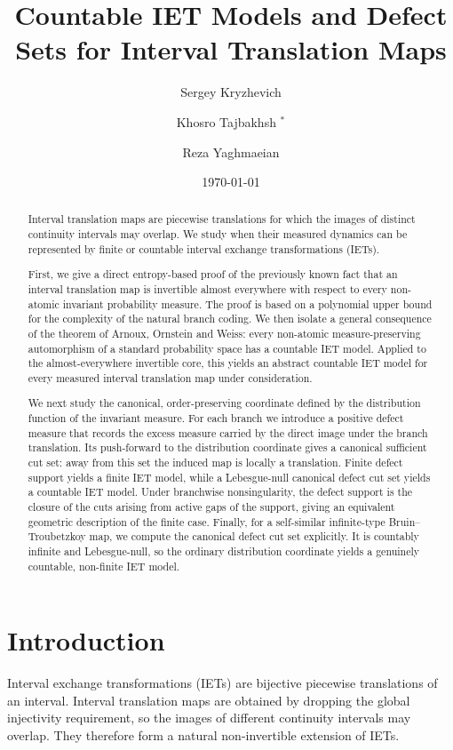 \documentclass[11pt]{amsart}
\title[Countable IET models for interval translation maps]
{Countable IET Models and Defect Sets for Interval Translation Maps}
\author[S. Kryzhevich]{Sergey Kryzhevich}
\author[K. Tajbakhsh]{Khosro Tajbakhsh $^{*}$}
\author[R. Yaghmaeian]{Reza Yaghmaeian}
\date{\today}
\theoremstyle{plain}
\theoremstyle{definition}
\theoremstyle{remark}
\begin{document}
\begin{abstract}
Interval translation maps are piecewise translations for which the images of distinct
continuity intervals may overlap. We study when their measured dynamics can be represented
by finite or countable interval exchange transformations (IETs).

First, we give a direct entropy-based proof of the previously known fact that an interval
translation map is invertible almost everywhere with respect to every non-atomic invariant
probability measure. The proof is based on a polynomial upper bound for the complexity of the
natural branch coding. We then isolate a general consequence of the theorem of Arnoux,
Ornstein and Weiss: every non-atomic measure-preserving automorphism of a standard
probability space has a countable IET model. Applied to the almost-everywhere invertible
core, this yields an abstract countable IET model for every measured interval translation
map under consideration.

We next study the canonical, order-preserving coordinate defined by the distribution function
of the invariant measure. For each branch we introduce a positive defect measure that records
the excess measure carried by the direct image under the branch translation. Its push-forward
to the distribution coordinate gives a canonical sufficient cut set: away from this set the
induced map is locally a translation. Finite defect support yields a finite IET model, while a
Lebesgue-null canonical defect cut set yields a countable IET model. Under branchwise nonsingularity, the
defect support is the closure of the cuts arising from active gaps of the support, giving an
equivalent geometric description of the finite case. Finally, for a self-similar infinite-type
Bruin--Troubetzkoy map, we compute the canonical defect cut set explicitly. It is countably
infinite and Lebesgue-null, so the ordinary distribution coordinate yields a genuinely
countable, non-finite IET model.
\end{abstract}

\maketitle


\section{Introduction}

Interval exchange transformations (IETs) are bijective piecewise translations of an interval.
Interval translation maps are obtained by dropping the global injectivity requirement, so the
images of different continuity intervals may overlap. They therefore form a natural
non-invertible extension of IETs.
\end{document}
